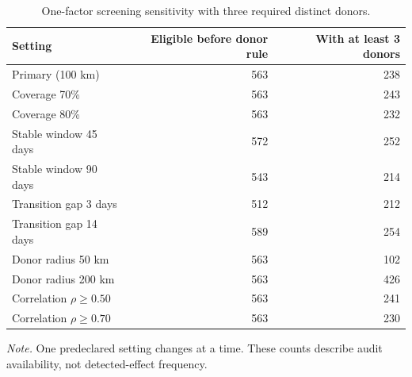 \begin{table}[tbp]
\centering
\caption{One-factor screening sensitivity with three required distinct donors.}
\label{tab:screening-sensitivity}
\scriptsize
\begin{tabular}{lrr}
\toprule
Setting & Eligible before donor rule & With at least 3 donors \\
\midrule
Primary (100 km) & 563 & 238 \\
Coverage 70\% & 563 & 243 \\
Coverage 80\% & 563 & 232 \\
Stable window 45 days & 572 & 252 \\
Stable window 90 days & 543 & 214 \\
Transition gap 3 days & 512 & 212 \\
Transition gap 14 days & 589 & 254 \\
Donor radius 50 km & 563 & 102 \\
Donor radius 200 km & 563 & 426 \\
Correlation $\rho \geq 0.50$ & 563 & 241 \\
Correlation $\rho \geq 0.70$ & 563 & 230 \\
\bottomrule
\end{tabular}
\par\smallskip
\begin{minipage}{0.94\linewidth}
\footnotesize\textit{Note.} One predeclared setting changes at a time. These counts describe audit availability, not detected-effect frequency.
\end{minipage}
\end{table}
